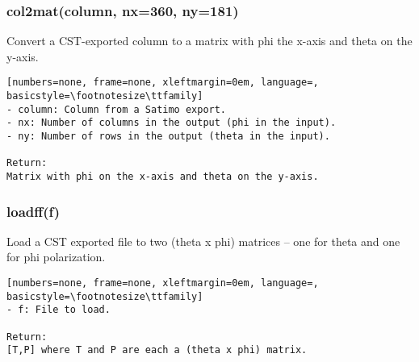 \subsubsection{col2mat(column, nx=360, ny=181)}
Convert a CST-exported column to a matrix with phi the 
x-axis and theta on the y-axis.

\begin{lstlisting}[numbers=none, frame=none, xleftmargin=0em, language=, basicstyle=\footnotesize\ttfamily]
- column: Column from a Satimo export.
- nx: Number of columns in the output (phi in the input).
- ny: Number of rows in the output (theta in the input).

Return:
Matrix with phi on the x-axis and theta on the y-axis.
\end{lstlisting}

\subsubsection{loadff(f)}
Load a CST exported file to two (theta x phi) matrices -- one for theta and
one for phi polarization.

\begin{lstlisting}[numbers=none, frame=none, xleftmargin=0em, language=, basicstyle=\footnotesize\ttfamily]
- f: File to load.

Return:
[T,P] where T and P are each a (theta x phi) matrix.
\end{lstlisting}

